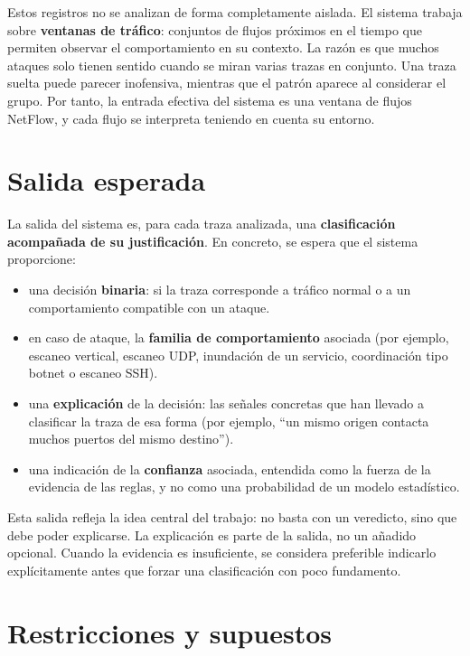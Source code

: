 Estos registros no se analizan de forma completamente aislada. El sistema trabaja sobre \textbf{ventanas de tráfico}: conjuntos de flujos próximos en el tiempo que permiten observar el comportamiento en su contexto. La razón es que muchos ataques solo tienen sentido cuando se miran varias trazas en conjunto. Una traza suelta puede parecer inofensiva, mientras que el patrón aparece al considerar el grupo. Por tanto, la entrada efectiva del sistema es una ventana de flujos NetFlow, y cada flujo se interpreta teniendo en cuenta su entorno.

\section{Salida esperada}
\label{sec:prob_salida}

La salida del sistema es, para cada traza analizada, una \textbf{clasificación acompañada de su justificación}. En concreto, se espera que el sistema proporcione:

\begin{itemize}
  \item una decisión \textbf{binaria}: si la traza corresponde a tráfico normal o a un comportamiento compatible con un ataque.
  \item en caso de ataque, la \textbf{familia de comportamiento} asociada (por ejemplo, escaneo vertical, escaneo UDP, inundación de un servicio, coordinación tipo botnet o escaneo SSH).
  \item una \textbf{explicación} de la decisión: las señales concretas que han llevado a clasificar la traza de esa forma (por ejemplo, ``un mismo origen contacta muchos puertos del mismo destino'').
  \item una indicación de la \textbf{confianza} asociada, entendida como la fuerza de la evidencia de las reglas, y no como una probabilidad de un modelo estadístico.
\end{itemize}

Esta salida refleja la idea central del trabajo: no basta con un veredicto, sino que debe poder explicarse. La explicación es parte de la salida, no un añadido opcional. Cuando la evidencia es insuficiente, se considera preferible indicarlo explícitamente antes que forzar una clasificación con poco fundamento.

\section{Restricciones y supuestos}
\label{sec:prob_restricciones}

